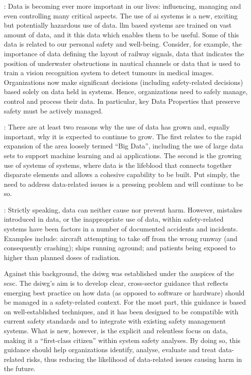 :
Data is becoming ever more important in our lives: influencing, managing and even controlling many critical aspects.
The use of \gls{ai} systems is a new, exciting but potentially hazardous use of data. \gls{llm} based systems are trained on vast amount of data, and it this data which enables them to be useful.
Some of this data is related to our personal safety and well-being.
Consider, for example, the importance of data defining the layout of railway signals,
data that indicates the position of underwater obstructions in nautical channels or data that
is used to train a vision recognition system to detect tumours in medical images.
Organizations now make significant decisions (including safety-related decisions) based solely on data held in systems.
Hence, organizations need to safely manage, control and process their data.
In particular, key Data Properties that preserve safety must be actively managed.

: There are at least two reasons why the use of data has grown and, equally important, why it is expected to continue to grow. The  first relates to the rapid expansion of the area loosely termed ``Big Data'', including the use of large data sets to support machine learning and \gls{ai} applications. The second is the growing use of systems of systems, where data is the lifeblood that connects together disparate elements and allows a cohesive capability to be built. Put simply, the need to address data-related issues is a pressing problem and will continue to be so.

: Strictly speaking,
data can neither cause nor prevent harm.
However, mistakes introduced in data, or the inappropriate use of data, within safety-related systems have been factors in a number of documented accidents and incidents. Examples include: aircraft attempting to take off from the wrong runway (and consequently crashing); ships running aground; and patients being exposed to higher than planned doses of radiation.

Against this background, the \gls{dsiwg} was established under the auspices of the \gls{scsc}. The \gls{dsiwg}'s aim is to develop clear, cross-sector guidance that reflects emerging best practice on how data (as opposed to software or hardware) should be managed in a safety-related context.
For the most part, this guidance is based on well-established techniques,
and it has been designed to be compatible with current safety standards and to integrate with existing safety management systems.
What is new, however, is the explicit and relentless focus on data, making it a ``first-class citizen'' within system safety analyses.
By doing so, this guidance should help organizations identify, analyse, evaluate and treat data-related risks, thus reducing the likelihood of data-related issues causing harm in the future.

